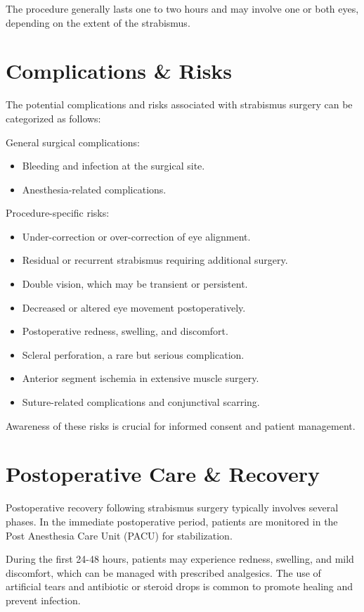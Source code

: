 The procedure generally lasts one to two hours and may involve one or both eyes, depending on the extent of the strabismus.

\section*{Complications \& Risks}
The potential complications and risks associated with strabismus surgery can be categorized as follows:

General surgical complications:

\begin{itemize}
  \item Bleeding and infection at the surgical site.
  \item Anesthesia-related complications.
\end{itemize}

Procedure-specific risks:

\begin{itemize}
  \item Under-correction or over-correction of eye alignment.
  \item Residual or recurrent strabismus requiring additional surgery.
  \item Double vision, which may be transient or persistent.
  \item Decreased or altered eye movement postoperatively.
  \item Postoperative redness, swelling, and discomfort.
  \item Scleral perforation, a rare but serious complication.
  \item Anterior segment ischemia in extensive muscle surgery.
  \item Suture-related complications and conjunctival scarring.
\end{itemize}

Awareness of these risks is crucial for informed consent and patient management.

\section*{Postoperative Care \& Recovery}
Postoperative recovery following strabismus surgery typically involves several phases. In the immediate postoperative period, patients are monitored in the Post Anesthesia Care Unit (PACU) for stabilization. 

During the first 24-48 hours, patients may experience redness, swelling, and mild discomfort, which can be managed with prescribed analgesics. The use of artificial tears and antibiotic or steroid drops is common to promote healing and prevent infection. 

